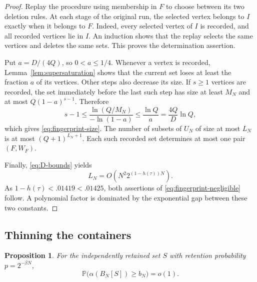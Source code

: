 \documentclass[11pt,leqno]{amsart}
\numberwithin{equation}{section}
\newtheorem{proposition}[theorem]{Proposition}
\theoremstyle{definition}
\theoremstyle{remark}
\newcommand{\Prob}{\mathbb P}
\begin{document}
\begin{proof}
Replay the procedure using membership in $F$ to choose between its two deletion rules. At each stage of the original run, the selected vertex belongs to $I$ exactly when it belongs to $F$. Indeed, every selected vertex of $I$ is recorded, and all recorded vertices lie in $I$. An induction shows that the replay selects the same vertices and deletes the same sets. This proves the determination assertion.

Put $a=D/(4Q)$, so $0<a\le1/4$. Whenever a vertex is recorded, Lemma~\ref{lem:supersaturation} shows that the current set loses at least the fraction $a$ of its vertices. Other steps also decrease its size. If $s\ge1$ vertices are recorded, the set immediately before the last such step has size at least $M_N$ and at most $Q(1-a)^{s-1}$. Therefore
\[
 s-1\le\frac{\ln(Q/M_N)}{-\ln(1-a)}
 \le\frac{\ln Q}{a}=\frac{4Q}{D}\ln Q,
\]
which gives \eqref{eq:fingerprint-size}. The number of subsets of $U_N$ of size at most $L_N$ is at most $(Q+1)^{L_N+1}$. Each such recorded set determines at most one pair $(F,W_F)$.

Finally, \eqref{eq:D-bounds} yields
\[
 L_N=O\left(N^2 2^{(1-h(\tau))N}\right).
\]
As $1-h(\tau)<.01419<.01425$, both assertions of \eqref{eq:fingerprint-negligible} follow. A polynomial factor is dominated by the exponential gap between these two constants.
\end{proof}

\subsection{Thinning the containers}

\begin{proposition}\label{prop:blue-free}
For the independently retained set $S$ with retention probability $p=2^{-\beta N}$,
\begin{equation}\label{eq:blue-failure}
 \Prob\bigl(\alpha(B_N[S])\ge b_N\bigr)=o(1).
\end{equation}
\end{proposition}
\end{document}
